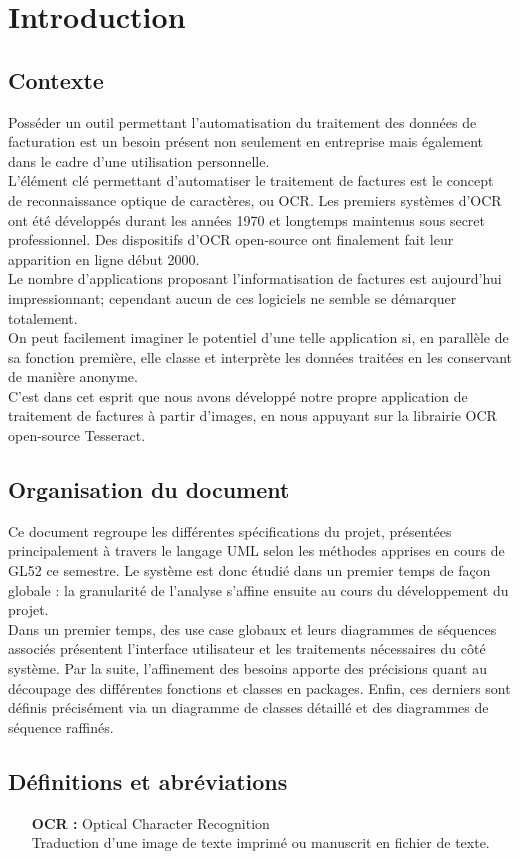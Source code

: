 \chapter{Introduction}

\section{Contexte}

Posséder un outil permettant l'automatisation du traitement des données de facturation est un besoin présent non seulement en entreprise mais également dans le cadre d'une utilisation personnelle.\\

L'élément clé permettant d'automatiser le traitement de factures est le concept de reconnaissance optique de caractères, ou OCR. 
Les premiers systèmes d'OCR ont été développés durant les années 1970 et longtemps maintenus sous secret professionnel. Des dispositifs d'OCR open-source ont finalement fait leur apparition en ligne début 2000.\\

Le nombre d'applications proposant l'informatisation de factures est aujourd'hui impressionnant; cependant aucun de ces logiciels ne semble se démarquer totalement.\\

On peut facilement imaginer le potentiel d'une telle application si, en parallèle de sa fonction première, elle classe et interprète les données traitées en les conservant de manière anonyme.\\

C'est dans cet esprit que nous avons développé notre propre application de traitement de factures à partir d'images, en nous appuyant sur la librairie OCR open-source Tesseract.

\section{Organisation du document}
Ce document regroupe les différentes spécifications du projet, présentées principalement à travers le langage UML selon les méthodes apprises en cours de GL52 ce semestre. Le système est donc étudié dans un premier temps de façon globale : la granularité de l'analyse s'affine ensuite au cours du développement du projet.\\

Dans un premier temps, des use case globaux et leurs diagrammes de séquences associés présentent l'interface utilisateur et les traitements nécessaires du côté système. Par la suite, l'affinement des besoins apporte des précisions quant au découpage des différentes fonctions et classes en packages. Enfin, ces derniers sont définis précisément via un diagramme de classes détaillé et des diagrammes de séquence raffinés.

\section{Définitions et abréviations}

\begin{itemize}
	\item[{\bf OCR :}] Optical Character Recognition \\
	Traduction d'une image de texte imprimé ou manuscrit en fichier de texte.
\end{itemize}
